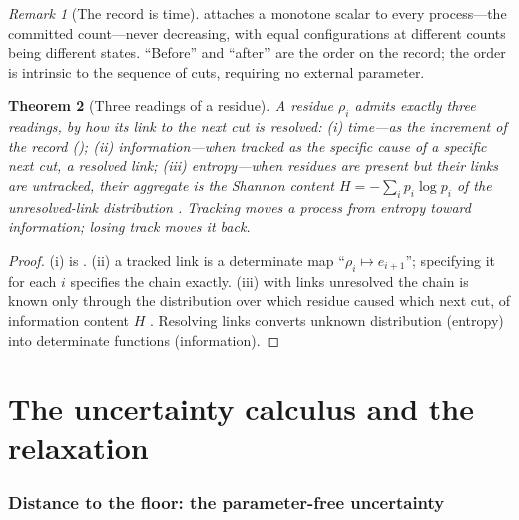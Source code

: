 \documentclass[twocolumn,11pt,a4paper]{article}
\theoremstyle{sup}
\newtheorem{theorem}{Theorem}[section]
\theoremstyle{definition}
\theoremstyle{remark}
\newtheorem{remark}[theorem]{Remark}
\newcommand{\res}{\rho}
\begin{document}
\begin{remark}[The record is time]
\label{rem:time}
 attaches a monotone scalar to every process---the committed
count---never decreasing, with equal configurations at different counts being
different states. ``Before'' and ``after'' are the order on the record;
the order is intrinsic to the sequence of cuts, requiring no external parameter.
\end{remark}

\begin{theorem}[Three readings of a residue]
\label{thm:three}
A residue $\res_i$ admits exactly three readings, by how its link to the next
cut is resolved: \textup{(i)} \emph{time}---as the increment of the record
(); \textup{(ii)} \emph{information}---when tracked as the
specific cause of a specific next cut, a resolved link; \textup{(iii)}
\emph{entropy}---when residues are present but their links are untracked, their
aggregate is the Shannon content $H=-\sum_i p_i\log p_i$ of the unresolved-link
distribution \citep{shannon1948,cover2006}. Tracking moves a process from
entropy toward information; losing track moves it back.
\end{theorem}

\begin{proof}
(i) is . (ii) a tracked link is a determinate map
``$\res_i\mapsto e_{i+1}$''; specifying it for each $i$ specifies the chain
exactly. (iii) with links unresolved the chain is known only through the
distribution over which residue caused which next cut, of information content
$H$ \citep{shannon1948}. Resolving links converts unknown distribution (entropy)
into determinate functions (information).
\end{proof}

\part{The uncertainty calculus and the relaxation}

\section{Distance to the floor: the parameter-free uncertainty}
\label{sec:distance}
\end{document}

